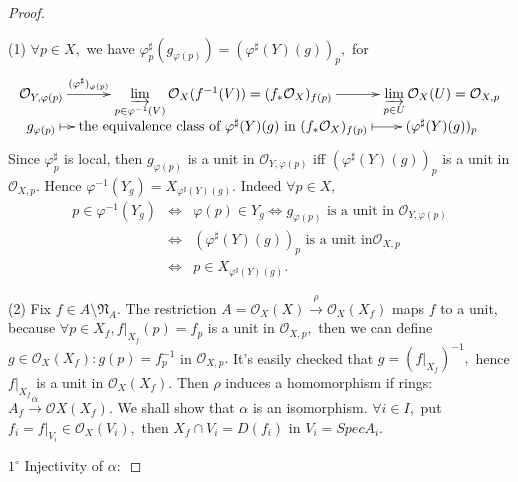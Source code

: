 \begin{proof}\
\enum
\item[(1)]$\forall p\in X,$ we have
$\varphi^{\sharp}_p(g_{\varphi(p)})=(\varphi^{\sharp}(Y)(g))_p,$ for
\[ \xymatrix@R=0em@C=0.5em{
   {\mathcal {O}_{Y,\varphi(p)}} \ar[r]^-{(\varphi^{\sharp})_{\varphi(p)}} &
   {\varinjlim\limits_{p\in \varphi^{-1}(V)}\mathcal {O}_X(f^{-1}(V))=(f_{\ast}\mathcal
   {O}_X)_{f(p)}} \ar[r] & {\varinjlim\limits_{p\in U}\mathcal {O}_X(U)=\mathcal
   {O}_{X,p}}                                    \\
   {g_{\varphi(p)}} \ar@{|->}[r] & {\text{the equivalence class of }\varphi^{\sharp}(Y)(g)\text{ in }(f_{\ast}\mathcal
   {O}_X)_{f(p)}} \ar@{|->}[r] & {(\varphi^{\sharp}(Y)(g))_p} }  \]
Since $\varphi^{\sharp}_p$ is local, then $g_{\varphi(p)}$ is a unit
in $\mathcal {O}_{Y,\varphi(p)}$ iff $(\varphi^{\sharp}(Y)(g))_p$ is
a unit in $\mathcal {O}_{X,p}.$ Hence
$\varphi^{-1}(Y_g)=X_{\varphi^{\sharp}(Y)(g)}.$ Indeed $\forall p\in
X,$
\begin{eqnarray*}
p\in \varphi^{-1}(Y_g) & \Leftrightarrow & \varphi(p)\in
Y_g\Leftrightarrow g_{\varphi(p)} \text{ is a unit in }\mathcal
{O}_{Y,\varphi(p)}                                           \\
& \Leftrightarrow & (\varphi^{\sharp}(Y)(g))_p \text{ is a unit in
}\mathcal {O}_{X,p}                                          \\
& \Leftrightarrow & p\in X_{\varphi^{\sharp}(Y)(g)}.
\end{eqnarray*}
\item[(2)]Fix $f\in A\setminus \mathfrak{N}_A.$ The restriction $A=\mathcal
{O}_X(X)\stackrel{\rho}{\rightarrow} \mathcal {O}_X(X_f)$ maps $f$
to a unit, because $\forall p\in X_f, \left.f\right|_{X_f}(p)=f_p$
is a unit in $\mathcal {O}_{X,p},$ then we can define $g\in \mathcal
{O}_X(X_f): g(p)=f_p^{-1}$ in $\mathcal {O}_{X,p}.$ It's easily
checked that $g=(\left.f\right|_{X_f})^{-1},$ hence
$\left.f\right|_{X_f}$ is a unit in $\mathcal {O}_X(X_f).$ Then
$\rho$ induces a homomorphism if rings:
$A_f\stackrel{\alpha}{\rightarrow} \mathcal {O}X(X_f).$ We shall
show that $\alpha$ is an isomorphism. $\forall i\in I,$ put
$f_i=\left.f\right|_{V_i}\in \mathcal {O}_X(V_i),$ then $X_f\cap
V_i=D(f_i)$ in $V_i=SpecA_i.$

$\mathit{1^{\circ}}$ Injectivity of $\alpha:$


\end{proof}
